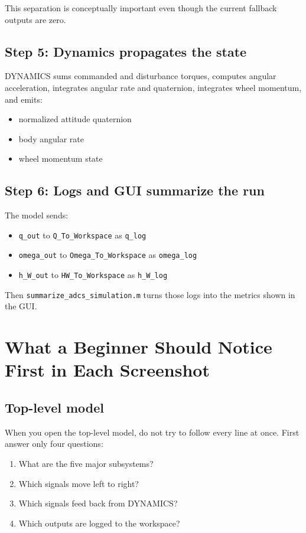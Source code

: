 \documentclass[11pt]{article}
\begin{document}
This separation is conceptually important even though the current fallback outputs are zero.

\subsection{Step 5: Dynamics propagates the state}

DYNAMICS sums commanded and disturbance torques, computes angular acceleration, integrates angular rate and quaternion, integrates wheel momentum, and emits:

\begin{itemize}
\item normalized attitude quaternion
\item body angular rate
\item wheel momentum state
\end{itemize}

\subsection{Step 6: Logs and GUI summarize the run}

The model sends:

\begin{itemize}
\item \texttt{q\_out} to \texttt{Q\_To\_Workspace} as \texttt{q\_log}
\item \texttt{omega\_out} to \texttt{Omega\_To\_Workspace} as \texttt{omega\_log}
\item \texttt{h\_W\_out} to \texttt{HW\_To\_Workspace} as \texttt{h\_W\_log}
\end{itemize}

Then \texttt{summarize\_adcs\_simulation.m} turns those logs into the metrics shown in the GUI.

\section{What a Beginner Should Notice First in Each Screenshot}

\subsection{Top-level model}

When you open the top-level model, do not try to follow every line at once. First answer only four questions:

\begin{enumerate}
\item What are the five major subsystems?
\item Which signals move left to right?
\item Which signals feed back from DYNAMICS?
\item Which outputs are logged to the workspace?
\end{enumerate}
\end{document}
